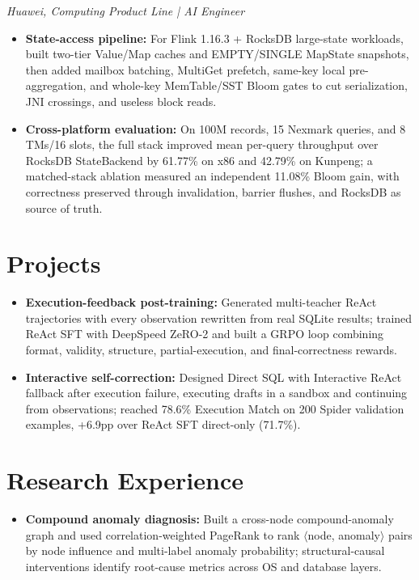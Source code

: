 \documentclass{resume}
\begin{document}
{\small\itshape Huawei, Computing Product Line | AI Engineer\par}
\begin{itemize}[parsep=0.25ex]
  \item \textbf{State-access pipeline:} For Flink 1.16.3 + RocksDB large-state workloads, built two-tier Value/Map caches and EMPTY/SINGLE MapState snapshots, then added mailbox batching, MultiGet prefetch, same-key local pre-aggregation, and whole-key MemTable/SST Bloom gates to cut serialization, JNI crossings, and useless block reads.
  \item \textbf{Cross-platform evaluation:} On 100M records, 15 Nexmark queries, and 8 TMs/16 slots, the full stack improved mean per-query throughput over RocksDB StateBackend by 61.77\% on x86 and 42.79\% on Kunpeng; a matched-stack ablation measured an independent 11.08\% Bloom gain, with correctness preserved through invalidation, barrier flushes, and RocksDB as source of truth.
\end{itemize}

\section{Projects}
\begin{itemize}[parsep=0.25ex]
  \item \textbf{Execution-feedback post-training:} Generated multi-teacher ReAct trajectories with every observation rewritten from real SQLite results; trained ReAct SFT with DeepSpeed ZeRO-2 and built a GRPO loop combining format, validity, structure, partial-execution, and final-correctness rewards.
  \item \textbf{Interactive self-correction:} Designed Direct SQL with Interactive ReAct fallback after execution failure, executing drafts in a sandbox and continuing from observations; reached 78.6\% Execution Match on 200 Spider validation examples, +6.9pp over ReAct SFT direct-only (71.7\%).
\end{itemize}


\section{Research Experience}
\begin{itemize}[parsep=0.25ex]
  \item \textbf{Compound anomaly diagnosis:} Built a cross-node compound-anomaly graph and used correlation-weighted PageRank to rank $\langle$node, anomaly$\rangle$ pairs by node influence and multi-label anomaly probability; structural-causal interventions identify root-cause metrics across OS and database layers.
\end{itemize}
\end{document}
